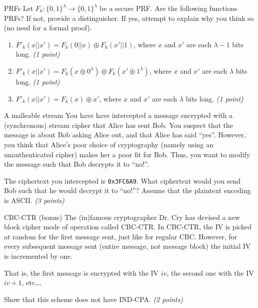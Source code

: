 \documentclass{homework}
\begin{document}
\begin{task}{PRFs}
  Let $F_k: \{0,1\}^\lambda \to \{0,1\}^\lambda$ be a secure PRF.
  Are the following functions PRFs?
  If not, provide a distinguisher.
  If yes, attempt to explain why you think so (no need for a formal proof).

  \begin{enumerate}
    \item $F'_k(x \vert\vert x') = F_k(0\vert\vert x) \oplus F_k(x'\vert\vert 1)$, where $x$ and $x'$ are each $\lambda - 1$ bits long. \textit{(1 point)}
    \item $F'_k(x \vert\vert x') = F_k(x \oplus 0^\lambda) \oplus F_k(x' \oplus 1^\lambda)$, where $x$ and $x'$ are each $\lambda$ bits long. \textit{(1 point)}
    \item $F'_k(x \vert\vert x') = F_k(x) \oplus x'$, where $x$ and $x'$ are each $\lambda$ bits long. \textit{(1 point)}
  \end{enumerate}
\end{task}

\begin{task}{A malleable stream}
  You have have intercepted a message encrypted with a (synchronous) stream cipher that Alice has sent Bob.
  You suspect that the message is about Bob asking Alice out, and that Alice has said \enquote{yes}.
  However, you think that Alice's poor choice of cryptography (namely using an unauthenticated cipher) makes her a poor fit for Bob.
  Thus, you want to modify the message such that Bob decrypts it to \enquote{no!}.

  The ciphertext you intercepted is \texttt{0x3FC6A9}.
  What ciphertext would you send Bob such that he would decrypt it to \enquote{no!}?
  Assume that the plaintext encoding is ASCII. \textit{(3 points)}
\end{task}

\newpage

\begin{task}{CBC-CTR (bonus)}
  The (in)famous cryptographer Dr. Cry has devised a new block cipher mode of operation called CBC-CTR.
  In CBC-CTR, the IV is picked at random for the first message sent, just like for regular CBC.
  However, for every subsequent message sent (entire message, not message block) the initial IV is incremented by one.

  That is, the first message is encrypted with the IV $iv$, the second one with the IV $iv + 1$, etc\dots.

  Show that this scheme does not have IND-CPA. \textit{(2 points)}
\end{task}
\end{document}
